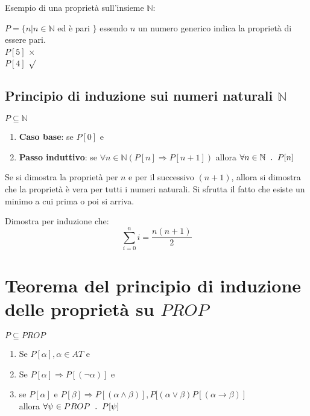 \documentclass{article}
\theoremstyle{break}
\theoremstyle{break}
\theoremstyle{break}
\theoremstyle{break}
\begin{document}
\begin{example}
	Esempio di una proprietà sull'insieme \( \mathbb{N} \):

	\( P = \{n | n \in \mathbb{N} \) ed è pari \( \} \) essendo \( n \) un numero generico
	indica la proprietà di essere pari.
	\\
	\( P[5] \) \( \times  \)\\
	\( P[4] \) \( \surd \)
\end{example}

\subsection{Principio di induzione sui numeri naturali \( \mathbb{N} \)}
\( P \subseteq \mathbb{N} \)
\begin{enumerate}
	\item \textbf{Caso base}: se \( P[0] \) e
	\item \textbf{Passo induttivo}: se \( \forall n \in \mathbb{N} (P[n] \Rightarrow P[n+1]) \)
	      allora \( \forall n \in \mathbb{N} \hspace{2mm} . \hspace{2mm} P[n] \)
\end{enumerate}

Se si dimostra la proprietà per \( n \) e per il successivo \( (n+1) \), allora
si dimostra che la proprietà è vera per tutti i numeri naturali. Si sfrutta
il fatto che esiste un minimo a cui prima o poi si arriva.
\begin{exercise}
	Dimostra per induzione che:
	\[\sum_{i=0}^{n} i = \frac{n(n+1)}{2}\]

\end{exercise}
\section{Teorema del principio di induzione delle proprietà su \( PROP \)}
\begin{definition}
	\( P \subseteq PROP \)
	\begin{enumerate}
		\item Se \( P[\alpha ], \alpha \in AT \) e
		\item Se \( P[\alpha ] \Rightarrow P[(\neg \alpha )] \) e
		\item se \( P[\alpha ]\) e \(P[\beta ] \Rightarrow P[(\alpha \wedge \beta )],
		      P[(\alpha \vee \beta) P[(\alpha \to \beta )]\)\\
		      allora \( \forall \psi \in PROP \hspace{2mm} . \hspace{2mm} P[\psi]\)
	\end{enumerate}
\end{definition}
\end{document}
